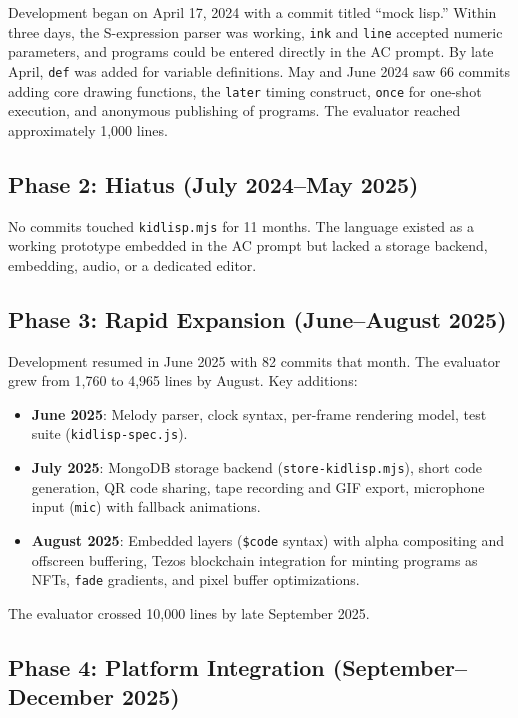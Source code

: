 \documentclass[10pt,letterpaper,twocolumn]{article}
\begin{document}
Development began on April 17, 2024 with a commit titled ``mock lisp.'' Within three days, the S-expression parser was working, \texttt{ink} and \texttt{line} accepted numeric parameters, and programs could be entered directly in the AC prompt. By late April, \texttt{def} was added for variable definitions. May and June 2024 saw 66 commits adding core drawing functions, the \texttt{later} timing construct, \texttt{once} for one-shot execution, and anonymous publishing of programs. The evaluator reached approximately 1,000 lines.

\subsection{Phase 2: Hiatus (July 2024--May 2025)}

No commits touched \texttt{kidlisp.mjs} for 11 months. The language existed as a working prototype embedded in the AC prompt but lacked a storage backend, embedding, audio, or a dedicated editor.

\subsection{Phase 3: Rapid Expansion (June--August 2025)}

Development resumed in June 2025 with 82 commits that month. The evaluator grew from 1,760 to 4,965 lines by August. Key additions:

\begin{itemize}
  \item \textbf{June 2025}: Melody parser, clock syntax, per-frame rendering model, test suite (\texttt{kidlisp-spec.js}).
  \item \textbf{July 2025}: MongoDB storage backend (\texttt{store-kidlisp.mjs}), short code generation, QR code sharing, tape recording and GIF export, microphone input (\texttt{mic}) with fallback animations.
  \item \textbf{August 2025}: Embedded layers (\texttt{\$code} syntax) with alpha compositing and offscreen buffering, Tezos blockchain integration for minting programs as NFTs, \texttt{fade} gradients, and pixel buffer optimizations.
\end{itemize}

The evaluator crossed 10,000 lines by late September 2025.

\subsection{Phase 4: Platform Integration (September--December 2025)}
\end{document}

